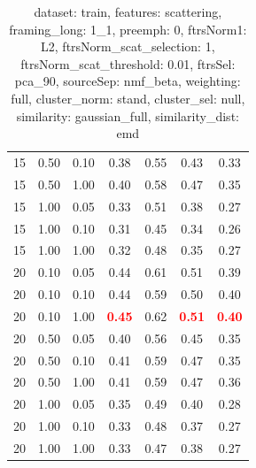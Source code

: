 \documentclass[12pt,a4paper,fleqn]{tufte-handout}
\begin{document}
\begin{table}
\begin{center}
\begin{tabular}{lllcccc}
15 & 0.50 & 0.10 & 0.38 & 0.55 & 0.43 & 0.33 \\            
15 & 0.50 & 1.00 & 0.40 & 0.58 & 0.47 & 0.35 \\            
15 & 1.00 & 0.05 & 0.33 & 0.51 & 0.38 & 0.27 \\            
15 & 1.00 & 0.10 & 0.31 & 0.45 & 0.34 & 0.26 \\            
15 & 1.00 & 1.00 & 0.32 & 0.48 & 0.35 & 0.27 \\            
20 & 0.10 & 0.05 & 0.44 & 0.61 & 0.51 & 0.39 \\            
20 & 0.10 & 0.10 & 0.44 & 0.59 & 0.50 & 0.40 \\            
20 & 0.10 & 1.00 & \textbf{\textcolor{red}{0.45}} & 0.62 & \textbf{\textcolor{red}{0.51}} & \textbf{\textcolor{red}{0.40}} \\            
20 & 0.50 & 0.05 & 0.40 & 0.56 & 0.45 & 0.35 \\            
20 & 0.50 & 0.10 & 0.41 & 0.59 & 0.47 & 0.35 \\            
20 & 0.50 & 1.00 & 0.41 & 0.59 & 0.47 & 0.36 \\            
20 & 1.00 & 0.05 & 0.35 & 0.49 & 0.40 & 0.28 \\            
20 & 1.00 & 0.10 & 0.33 & 0.48 & 0.37 & 0.27 \\            
20 & 1.00 & 1.00 & 0.33 & 0.47 & 0.38 & 0.27 \\            
\end{tabular}            
\end{center}            
\caption{dataset: train, features: scattering, framing\_long: 1\_1, preemph: 0, ftrsNorm1: L2, ftrsNorm\_scat\_selection: 1, ftrsNorm\_scat\_threshold: 0.01, ftrsSel: pca\_90, sourceSep: nmf\_beta, weighting: full, cluster\_norm: stand, cluster\_sel: null, similarity: gaussian\_full, similarity\_dist: emd}            
\label{datasetrFeaturscFraminlong1_1Preemp0Ftrsnorm1L2Ftrsnoscatselect1Ftrsnoscatthresh0.01Ftrsselpc90SourcesepnmbeWeightfuClustenormstClusteselnuSimilagafuSimiladistem}            
\end{table}            
 
\end{document}
